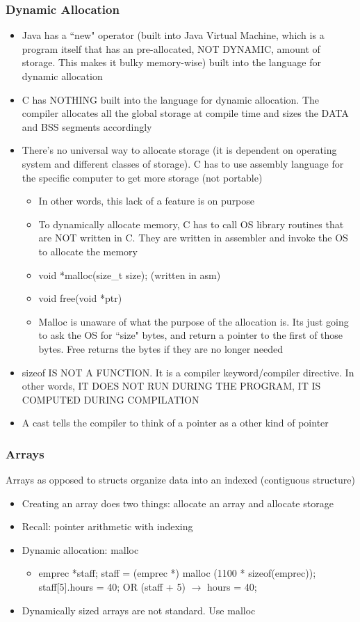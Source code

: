 \subsubsection{Dynamic Allocation}
\begin{itemize}
    \item Java has a ``new" operator (built into Java Virtual Machine, which is a program itself that has an pre-allocated, NOT DYNAMIC, amount of storage. This makes it bulky memory-wise) built into the language for dynamic allocation
    \item C has NOTHING built into the language for dynamic allocation. The compiler allocates all the global storage at compile time and sizes the DATA and BSS segments accordingly
    \item There's no universal way to allocate storage (it is dependent on operating system and different classes of storage). C has to use assembly language for the specific computer to get more storage (not portable)
    \begin{itemize}
        \item In other words, this lack of a feature is on purpose
        \item To dynamically allocate memory, C has to call OS library routines that are NOT written in C. They are written in assembler and invoke the OS to allocate the memory
        \item void *malloc(size\_t size); (written in asm)
        \item void free(void *ptr)
        \item Malloc is unaware of what the purpose of the allocation is. Its just going to ask the OS for ``size" bytes, and return a pointer to the first of those bytes. Free returns the bytes if they are no longer needed
    \end{itemize}
    \item sizeof IS NOT A FUNCTION. It is a compiler keyword/compiler directive. In other words, IT DOES NOT RUN DURING THE PROGRAM, IT IS COMPUTED DURING COMPILATION
    \item A cast tells the compiler to think of a pointer as a other kind of pointer
\end{itemize}
\subsubsection{Arrays}
Arrays as opposed to structs organize data into an indexed (contiguous structure)
\begin{itemize}
    \item Creating an array does two things: allocate an array and allocate storage
    \item Recall: pointer arithmetic with indexing
    \item Dynamic allocation: malloc
    \begin{itemize}
        \item emprec *staff; staff = (emprec *) malloc (1100 * sizeof(emprec));\\staff[5].hours = 40; OR (staff + 5) $\rightarrow$ hours = 40;
    \end{itemize}
    \item Dynamically sized arrays are not standard. Use malloc
\end{itemize}
